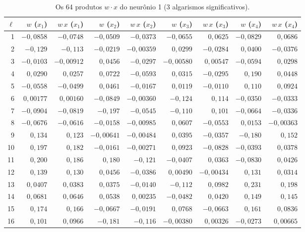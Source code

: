 \documentclass[11pt,a4paper]{article}
\begin{document}
\begin{table}[H]
\centering
\caption{Os 64 produtos $w\cdot x$ do neurônio 1 (3 algarismos significativos).}\label{tab:neuronio}
\footnotesize
\begin{tabular}{rrrrrrrrr}
\toprule
$\ell$ & $w$ ($\!x_1$) & $w\,x$ ($\!x_1$) & $w$ ($\!x_2$) & $w\,x$ ($\!x_2$) & $w$ ($\!x_3$) & $w\,x$ ($\!x_3$) & $w$ ($\!x_4$) & $w\,x$ ($\!x_4$) \\
\midrule
1 & $-0,0858$ & $-0,0748$ & $-0,0509$ & $-0,0373$ & $-0,0655$ & $0,0625$ & $-0,0829$ & $0,0686$ \\
2 & $-0,129$ & $-0,113$ & $-0,0219$ & $-0,00359$ & $0,0299$ & $-0,0284$ & $0,0400$ & $-0,0376$ \\
3 & $-0,0103$ & $-0,00912$ & $0,0456$ & $-0,0297$ & $-0,00580$ & $0,00547$ & $-0,0594$ & $0,0298$ \\
4 & $0,0290$ & $0,0257$ & $0,0722$ & $-0,0593$ & $0,0315$ & $-0,0295$ & $0,190$ & $0,0448$ \\
5 & $-0,0558$ & $-0,0499$ & $0,0461$ & $-0,0167$ & $0,0119$ & $-0,0110$ & $0,110$ & $0,0924$ \\
6 & $0,00177$ & $0,00160$ & $-0,0849$ & $-0,00360$ & $-0,124$ & $0,114$ & $-0,0350$ & $-0,0333$ \\
7 & $-0,0904$ & $-0,0819$ & $-0,197$ & $-0,0545$ & $-0,110$ & $0,101$ & $-0,0664$ & $-0,0336$ \\
8 & $-0,0676$ & $-0,0616$ & $-0,0158$ & $-0,00985$ & $0,0607$ & $-0,0553$ & $0,0153$ & $-0,00363$ \\
9 & $0,134$ & $0,123$ & $-0,00641$ & $-0,00484$ & $0,0395$ & $-0,0357$ & $-0,180$ & $0,152$ \\
10 & $0,197$ & $0,182$ & $-0,0161$ & $-0,00271$ & $0,0923$ & $-0,0828$ & $-0,0393$ & $0,0378$ \\
11 & $0,200$ & $0,186$ & $0,180$ & $-0,121$ & $-0,0407$ & $0,0363$ & $-0,0830$ & $0,0426$ \\
12 & $0,139$ & $0,130$ & $0,0456$ & $-0,0386$ & $0,00490$ & $-0,00434$ & $0,131$ & $0,0314$ \\
13 & $0,0407$ & $0,0383$ & $0,0375$ & $-0,0140$ & $-0,112$ & $0,0982$ & $0,231$ & $0,198$ \\
14 & $0,0681$ & $0,0646$ & $0,0538$ & $0,00235$ & $-0,0482$ & $0,0420$ & $0,149$ & $0,145$ \\
15 & $0,174$ & $0,166$ & $-0,0667$ & $-0,0191$ & $0,0768$ & $-0,0663$ & $0,161$ & $0,0836$ \\
16 & $0,101$ & $0,0966$ & $-0,181$ & $-0,116$ & $-0,00380$ & $0,00326$ & $-0,0273$ & $0,00665$ \\
\bottomrule
\end{tabular}
\par\vspace{2pt}{\footnotesize Fonte: elaborado pelo autor.}
\end{table}
\end{document}
